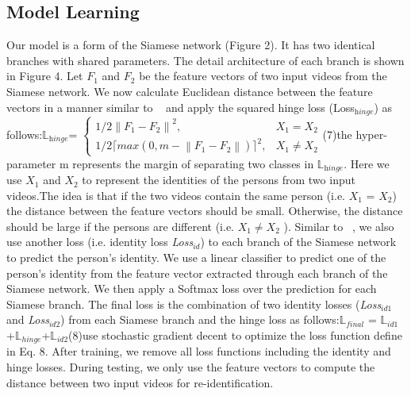 \documentclass[sigconf, authordraft,review=false]{acmart}
\begin{document}
\subsection{Model Learning}
Our model is a form of the Siamese network (Figure 2).
It has two identical branches with shared parameters.  The
detail  architecture  of  each  branch  is  shown  in  Figure  4.  Let $\textit{F}_1$ and  $\textit{F}_2$ be the feature vectors
of two input videos from the Siamese network. We now calculate Euclidean distance between the feature vectors in a manner similar to ~\cite{mclaughlin16_cvpr,xu17_iccv} and apply the squared hinge loss (Loss$_\textit{hinge}$) as follows:\newline\hspace{1cm}\(\mathbb{L}\)$_\textit{hinge}$= 
\(\begin{cases}
1/2\left\|  F_1 - F_2 \right\|^2, & X_1 = X_2\\
1/2\lceil max(0,m-\left\|  F_1 - F_2  \right\|) \rceil^2, & X_1 \neq X_2
\end{cases}\)\hspace{0.3cm}(7)\newlinewhere the hyper-parameter m represents the margin of separating two classes in \(\mathbb{L}\)$_\textit{hinge}$. Here we use $X_1$ and $X_2$ to represent the identities of the persons from two input videos.The idea is that if the two videos contain the same person (i.e.  $X_1$ = $X_2$) the distance between the feature vectors
should be small.  Otherwise, the distance should be large if
the persons are different (i.e. $X_1$\(\neq\)$X_2$ ). Similar to ~\cite{mclaughlin16_cvpr}, we also use another loss (i.e. identity loss \textit{Loss}$_{id}$) to each branch of the Siamese network to predict
the person\textup{'}s  identity.  We use a linear classifier to predict one of the person\textup{'}s  identity from the feature vector extracted through each branch of the Siamese network. We then apply a Softmax loss over the prediction for each Siamese branch.
The final loss is the combination of two identity losses (\textit{Loss}$_{id1}$ and \textit{Loss}$_{id2}$) from each Siamese branch and the hinge loss as follows:\newline\hspace{2cm}\(\mathbb{L}\)$_{final}$ = \(\mathbb{L}\)$_{id1}$+\(\mathbb{L}\)$_{hinge}$+\(\mathbb{L}\)$_{id2}$\hspace{2cm}(8)\newlineWe use stochastic gradient decent to optimize the loss
function define in Eq. 8.  After training, we remove all loss
functions including the identity and hinge losses.   During
testing, we only use the feature vectors to compute the distance between two input videos for re-identification.
\end{document}
